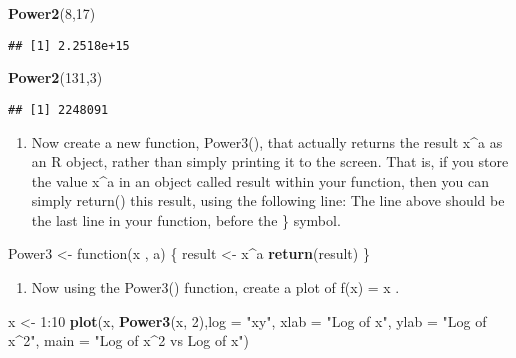 \documentclass[]{article}
\newenvironment{Shaded}{\begin{snugshade}}{\end{snugshade}}
\newcommand{\KeywordTok}[1]{\textcolor[rgb]{0.13,0.29,0.53}{\textbf{{#1}}}}
\newcommand{\DataTypeTok}[1]{\textcolor[rgb]{0.13,0.29,0.53}{{#1}}}
\newcommand{\DecValTok}[1]{\textcolor[rgb]{0.00,0.00,0.81}{{#1}}}
\newcommand{\StringTok}[1]{\textcolor[rgb]{0.31,0.60,0.02}{{#1}}}
\newcommand{\NormalTok}[1]{{#1}}
\providecommand{\tightlist}{%
  \setlength{\itemsep}{0pt}\setlength{\parskip}{0pt}}
\begin{document}
\begin{Shaded}
\begin{Highlighting}[]
\KeywordTok{Power2}\NormalTok{(}\DecValTok{8}\NormalTok{,}\DecValTok{17}\NormalTok{)}
\end{Highlighting}
\end{Shaded}

\begin{verbatim}
## [1] 2.2518e+15
\end{verbatim}

\begin{Shaded}
\begin{Highlighting}[]
\KeywordTok{Power2}\NormalTok{(}\DecValTok{131}\NormalTok{,}\DecValTok{3}\NormalTok{)}
\end{Highlighting}
\end{Shaded}

\begin{verbatim}
## [1] 2248091
\end{verbatim}

\begin{enumerate}
\def\labelenumi{(\alph{enumi})}
\setcounter{enumi}{3}
\tightlist
\item
  Now create a new function, Power3(), that actually returns the result
  x\^{}a as an R object, rather than simply printing it to the screen.
  That is, if you store the value x\^{}a in an object called result
  within your function, then you can simply return() this result, using
  the following line: The line above should be the last line in your
  function, before the \} symbol.
\end{enumerate}

\begin{Shaded}
\begin{Highlighting}[]
\NormalTok{Power3 <-}\StringTok{ }\NormalTok{function(x , a) \{}
    \NormalTok{result <-}\StringTok{ }\NormalTok{x^a}
    \KeywordTok{return}\NormalTok{(result)}
\NormalTok{\}}
\end{Highlighting}
\end{Shaded}

\begin{enumerate}
\def\labelenumi{(\alph{enumi})}
\setcounter{enumi}{4}
\tightlist
\item
  Now using the Power3() function, create a plot of f(x) = x .
\end{enumerate}

\begin{Shaded}
\begin{Highlighting}[]
\NormalTok{x <-}\StringTok{ }\DecValTok{1}\NormalTok{:}\DecValTok{10}
\KeywordTok{plot}\NormalTok{(x, }\KeywordTok{Power3}\NormalTok{(x, }\DecValTok{2}\NormalTok{),}\DataTypeTok{log =} \StringTok{"xy"}\NormalTok{, }\DataTypeTok{xlab =} \StringTok{"Log of x"}\NormalTok{, }\DataTypeTok{ylab =} \StringTok{"Log of x^2"}\NormalTok{, }\DataTypeTok{main =} \StringTok{"Log of x^2 vs Log of x"}\NormalTok{)}
\end{Highlighting}
\end{Shaded}
\end{document}
